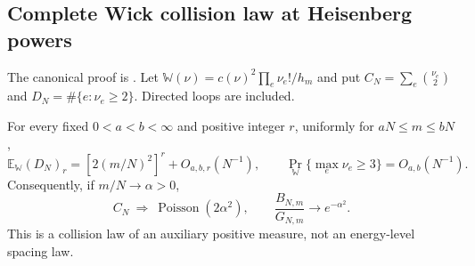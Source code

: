 \subsection{Complete Wick collision law at Heisenberg powers}
\label{subsec:wick-poisson-20261016}
The canonical proof is
.
Let $\mathbb W(\nu)=c(\nu)^2\prod_e\nu_e!/h_m$ and put
$C_N=\sum_e\binom{\nu_e}{2}$ and $D_N=\#\{e:\nu_e\ge2\}$.
Directed loops are included.
\begin{theorem}
For every fixed $0<a<b<\infty$ and positive integer $r$, uniformly for
$aN\le m\le bN$,
\[
 \mathbb E_{\mathbb W}(D_N)_r
    =[2(m/N)^2]^r+O_{a,b,r}(N^{-1}),\qquad
 \Pr_{\mathbb W}\{\max_e\nu_e\ge3\}=O_{a,b}(N^{-1}).
\]
Consequently, if $m/N\to\alpha>0$,
\[
 C_N\ \Longrightarrow\ \operatorname{Poisson}(2\alpha^2),
 \qquad \frac{B_{N,m}}{G_{N,m}}\longrightarrow e^{-\alpha^2}.
\]
This is a collision law of an auxiliary positive measure, not an
energy-level spacing law.
\end{theorem}
